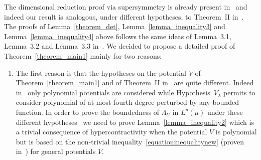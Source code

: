 \documentclass[a4paper,10pt]{article}
\newenvironment{enumeratenumeric}{\begin{enumerate}[1.] }{\end{enumerate}}
\begin{document}
\begin{remark}
  The dimensional reduction proof via supersymmetry is already present
  in~{\cite{Klein1984}} and indeed our result is analogous, under different
  hypotheses, to Theorem~II in~{\cite{Klein1984}}. The proofs of
  Lemma~\ref{theorem_det}, Lemma~\ref{lemma_inequality3} and
  Lemma~\ref{lemma_inequality4} above follows the same ideas of Lemma~3.1,
  Lemma~3.2 and Lemma~3.3 in~{\cite{Klein1984}}. We decided to propose a
  detailed proof of Theorem~\ref{theorem_main1} mainly for two reasons:
  \begin{enumeratenumeric}
    \item The first reason is that the hypotheses on the potential $V$ of
    Theorem~\ref{theorem_main1} and of Theorem~II in~{\cite{Klein1984}} are
    quite different. Indeed in~{\cite{Klein1984}} only polynomial potentials
    are considered while Hypothesis~$V_{\lambda}$ permits to consider
    polynomial of at most fourth degree perturbed by any bounded function. In
    order to prove the boundedness of $\Lambda_U$ in $L^p (\mu)$ under these
    different hypotheses \ we need to prove Lemma~\ref{lemma_inequality2}
    which is a trivial consequence of hypercontractivity when the potential
    $V$ is polynomial but is based on the non-trivial
    inequality~{\eqref{equationinequalitynew}} (proven
    in~{\cite{Ustunel2000}}) for general potentials $V$.
    

\end{enumeratenumeric}
\end{remark}
\end{document}
